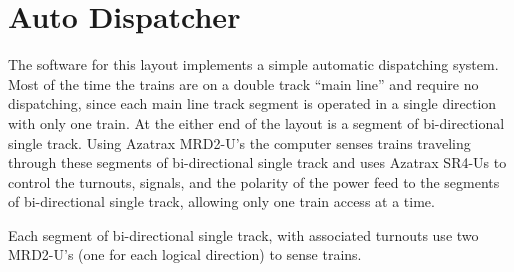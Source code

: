 
\chapter{Auto Dispatcher}
\label{chapt:AutoDispatcher}

The software for this layout implements a simple automatic dispatching
system. Most of the time the trains are on a double track ``main line''
and require no dispatching, since each main line track segment is
operated in a single direction with only one train.  At the either end of the
layout is a segment of bi-directional single track.  Using 
Azatrax MRD2-U's the computer senses trains traveling through these
segments of bi-directional single track and uses Azatrax SR4-Us to
control the turnouts, signals, and the polarity of the power feed to the
segments of bi-directional single track, allowing only one train access
at a time.

Each segment of bi-directional single track, with associated turnouts
use two MRD2-U's (one for each logical direction) to sense trains.

